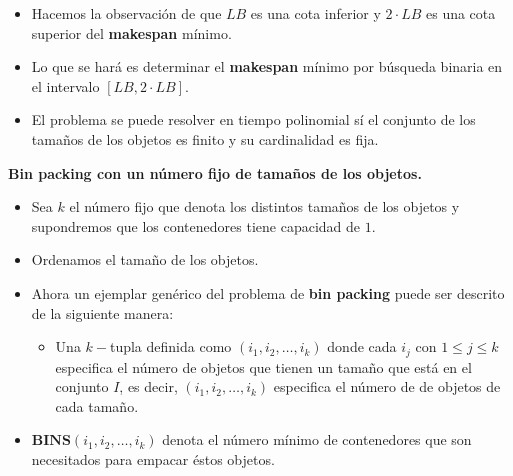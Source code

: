 \begin{frame}{\subsectiontitle}
    \begin{itemize}
    \item Hacemos la observación de que \(LB\) es una cota inferior y \(2 \cdot LB\) es una cota superior del \textbf{makespan} mínimo.
    \item Lo que se hará es determinar el \textbf{makespan} mínimo por búsqueda binaria en el intervalo \([LB, 2 \cdot LB]\). 
    \item El problema se puede resolver en tiempo polinomial sí el conjunto de los tamaños de los objetos es finito y su cardinalidad es fija.
\end{itemize}
\end{frame}

\begin{frame}{\subsectiontitle}
    \textbf{Bin packing con un número fijo de tamaños de los objetos.}
    \begin{itemize}
    \item Sea \(k\) el número fijo que denota los distintos tamaños de los objetos y supondremos que los contenedores tiene capacidad de \(1\).
    \item Ordenamos el tamaño de los objetos.
    \item Ahora un ejemplar genérico del problema de \textbf{bin packing} puede ser descrito de la siguiente manera:
    \begin{itemize}
        \item Una \(k-\)tupla definida como \(\left(i_{1}, i_{2}, \dotsc, i_{k}\right)\) donde cada \(i_{j}\) con \(1 \leq j \leq k\) especifica
        el número de objetos que tienen un tamaño que está en el conjunto \(I\), es decir, \(\left(i_{1}, i_{2}, \dotsc, i_{k}\right)\) especifica
        el número de de objetos de cada tamaño.
    \end{itemize}
    \item \(\mathbf{BINS}\left(i_{1}, i_{2}, \dotsc, i_{k}\right)\) denota el número mínimo de contenedores que son necesitados para empacar éstos objetos.
\end{itemize}
\end{frame}

